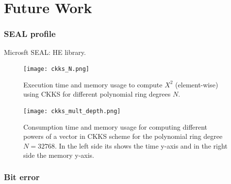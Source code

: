 \documentclass[10pt,handout]{beamer}
\begin{document}
\section{Future Work}
\begin{frame}
    \frametitle{SEAL profile}
Microsft SEAL: HE library.
    \begin{figure}
        \begin{minipage}[c]{0.49\linewidth}
            \texttt{[image: ckks\_N.png]}
            \caption{Execution time and memory usage to compute $X^2$ (element-wise) using CKKS for different polynomial ring degrees $N$.}
        \end{minipage}
        \hfill
        \begin{minipage}[c]{0.49\linewidth}
            \texttt{[image: ckks\_mult\_depth.png]}
            \caption{ Consumption time and memory usage for computing different powers of a vector in CKKS scheme for the polynomial ring degree $N=32768$.
    In the left side its shows the time y-axis and in the right side the memory y-axis.
}
        \end{minipage}%
    \end{figure}
\end{frame}
\begin{frame}
    \frametitle{Bit error}

\end{frame}
\end{document}
